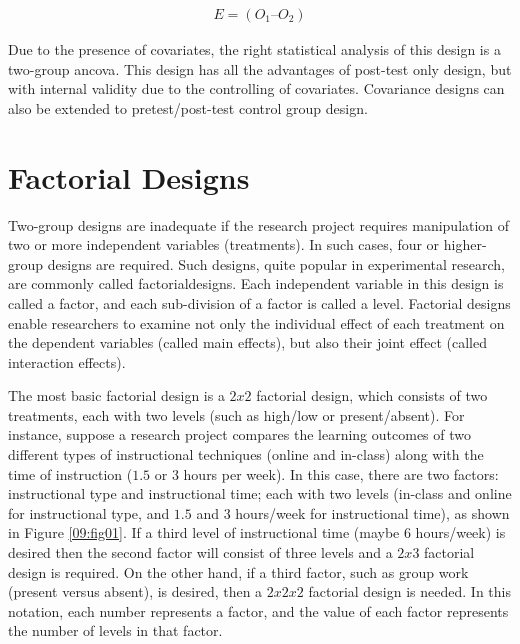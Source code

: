 \begin{align}
	\label{09:eq03}
	E = (O_1 – O_2)
\end{align}

Due to the presence of covariates, the right statistical analysis of this design is a two-group \gls{ancova}. This design has all the advantages of post-test only design, but with internal validity due to the controlling of covariates. Covariance designs can also be extended to pretest/post-test control group design.

\section{Factorial Designs}

Two-group designs are inadequate if the research project requires manipulation of two or more independent variables (treatments). In such cases, four or higher-group designs are required. Such designs, quite popular in experimental research, are commonly called \glspl{factorialdesign}. Each independent variable in this design is called a factor, and each sub-division of a factor is called a level. Factorial designs enable researchers to examine not only the individual effect of each treatment on the dependent variables (called main effects), but also their joint effect (called interaction effects).

The most basic factorial design is a $ 2 x 2 $ factorial design, which consists of two treatments, each with two levels (such as high/low or present/absent). For instance, suppose a research project compares the learning outcomes of two different types of instructional techniques (online and in-class) along with the time of instruction ($ 1.5 $ or $ 3 $ hours per week). In this case, there are two factors: instructional type and instructional time; each with two levels (in-class and online for instructional type, and $ 1.5 $ and $ 3 $ hours/week for instructional time), as shown in Figure \ref{09:fig01}. If a third level of instructional time (maybe $ 6 $ hours/week) is desired then the second factor will consist of three levels and a $ 2 x 3 $ factorial design is required. On the other hand, if a third factor, such as group work (present versus absent), is desired, then a $ 2 x 2 x 2 $ factorial design is needed. In this notation, each number represents a factor, and the value of each factor represents the number of levels in that factor.

